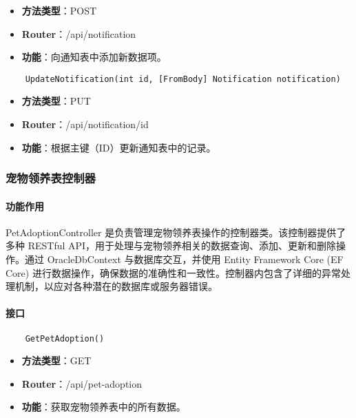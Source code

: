 \begin{itemize}
	\item \textbf{方法类型}：POST
	\item \textbf{Router}：/api/notification
	\item \textbf{功能}：向通知表中添加新数据项。
\end{itemize}

\begin{verbatim}
	UpdateNotification(int id, [FromBody] Notification notification)
\end{verbatim}

\begin{itemize}
	\item \textbf{方法类型}：PUT
	\item \textbf{Router}：/api/notification/{id}
	\item \textbf{功能}：根据主键（ID）更新通知表中的记录。
\end{itemize}

\subsubsection{宠物领养表控制器}

\paragraph{功能作用}

PetAdoptionController 是负责管理宠物领养表操作的控制器类。该控制器提供了多种 RESTful API，用于处理与宠物领养相关的数据查询、添加、更新和删除操作。通过 OracleDbContext 与数据库交互，并使用 Entity Framework Core (EF Core) 进行数据操作，确保数据的准确性和一致性。控制器内包含了详细的异常处理机制，以应对各种潜在的数据库或服务器错误。

\paragraph{接口}

\begin{verbatim}
	GetPetAdoption()
\end{verbatim}

\begin{itemize}
	\item \textbf{方法类型}：GET
	\item \textbf{Router}：/api/pet-adoption
	\item \textbf{功能}：获取宠物领养表中的所有数据。
\end{itemize}

